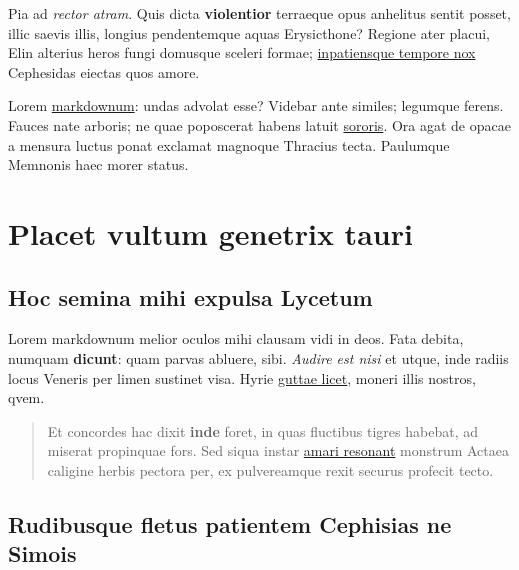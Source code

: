 \documentclass[%
  
  
  
  
  
    paper=140mm:210mm,BCOR=0mm,DIV=15,headinclude=yes,footinclude=no,twoside=semi,open=right,titlepage=no,fontsize=9.5pt,footnotes=multiple]
    {scrartcl}
\begin{document}
Pia ad \emph{rector atram}. Quis dicta \textbf{violentior} terraeque
opus anhelitus sentit posset, illic saevis illis, longius pendentemque
aquas Erysicthone? Regione ater placui, Elin alterius heros fungi
domusque sceleri formae; \href{http://gradive.com/ter.aspx}{inpatiensque
tempore nox} Cephesidas eiectas quos amore.

\makechaptertitle
{}

Lorem \href{http://conscialumen.com/venit}{markdownum}: undas advolat
esse? Videbar ante similes; legumque ferens. Fauces nate arboris; ne
quae poposcerat habens latuit \href{http://petere.com/esse}{sororis}.
Ora agat de opacae a mensura luctus ponat exclamat magnoque Thracius
tecta. Paulumque Memnonis haec morer status.

\hypertarget{placet-vultum-genetrix-tauri}{%
\section{Placet vultum genetrix
tauri}\label{placet-vultum-genetrix-tauri}}

\hypertarget{hoc-semina-mihi-expulsa-lycetum}{%
\subsection{Hoc semina mihi expulsa
Lycetum}\label{hoc-semina-mihi-expulsa-lycetum}}

Lorem markdownum melior oculos mihi clausam vidi in deos. Fata debita,
numquam \textbf{dicunt}: quam parvas abluere, sibi. \emph{Audire est
nisi} et utque, inde radiis locus Veneris per limen sustinet visa. Hyrie
\href{http://phoebe-ille.com/sisterehoc}{guttae licet}, moneri illis
nostros, qvem.

\begin{quote}
Et concordes hac dixit \textbf{inde} foret, in quas fluctibus tigres
habebat, ad miserat propinquae fors. Sed siqua instar
\href{http://crurumquegaleam.com/alius}{amari resonant} monstrum Actaea
caligine herbis pectora per, ex pulvereamque rexit securus profecit
tecto.
\end{quote}

\hypertarget{rudibusque-fletus-patientem-cephisias-ne-simois}{%
\subsection{Rudibusque fletus patientem Cephisias ne
Simois}\label{rudibusque-fletus-patientem-cephisias-ne-simois}}
\end{document}
